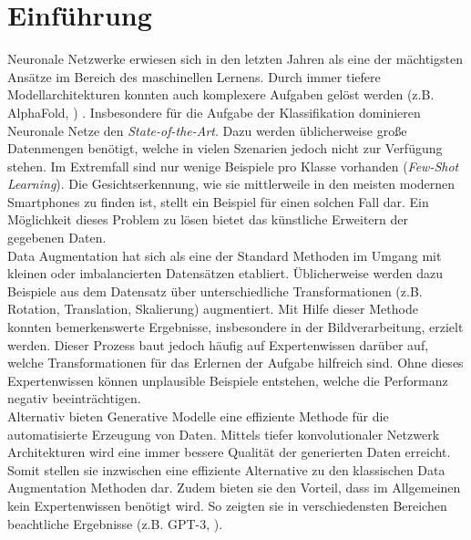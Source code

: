 \chapter{Einführung}
Neuronale Netzwerke erwiesen sich in den letzten Jahren als eine der mächtigsten Ansätze im Bereich des maschinellen Lernens. Durch immer tiefere Modellarchitekturen konnten auch komplexere Aufgaben gelöst werden (z.B. AlphaFold, \cite{Senior2020}) . Insbesondere für die Aufgabe der Klassifikation dominieren Neuronale Netze den \textit{State-of-the-Art}. Dazu werden üblicherweise große Datenmengen benötigt, welche in vielen Szenarien jedoch nicht zur Verfügung stehen. Im Extremfall sind nur wenige Beispiele pro Klasse vorhanden (\textit{Few-Shot Learning}). Die Gesichtserkennung, wie sie mittlerweile in den meisten modernen Smartphones zu finden ist, stellt ein Beispiel für einen solchen Fall dar. Ein Möglichkeit dieses Problem zu lösen bietet das künstliche Erweitern der gegebenen Daten. \\

Data Augmentation hat sich als eine der Standard Methoden im Umgang mit kleinen oder imbalancierten Datensätzen etabliert. Üblicherweise werden dazu Beispiele aus dem Datensatz über unterschiedliche Transformationen (z.B. Rotation, Translation, Skalierung) augmentiert. Mit Hilfe dieser Methode konnten bemerkenswerte Ergebnisse, insbesondere in der Bildverarbeitung, erzielt werden. Dieser Prozess baut jedoch häufig auf Expertenwissen darüber auf, welche Transformationen für das Erlernen der Aufgabe hilfreich sind. Ohne dieses Expertenwissen können unplausible Beispiele entstehen, welche die Performanz negativ beeinträchtigen. \\

Alternativ bieten Generative Modelle eine effiziente Methode für die automatisierte Erzeugung von Daten. Mittels tiefer konvolutionaler Netzwerk Architekturen wird eine immer bessere Qualität der generierten Daten erreicht. Somit stellen sie inzwischen eine effiziente Alternative zu den klassischen Data Augmentation Methoden dar. Zudem bieten sie den Vorteil, dass im Allgemeinen kein Expertenwissen benötigt wird. So zeigten sie in verschiedensten Bereichen beachtliche Ergebnisse (z.B. GPT-3, \cite{brown2020language}). \\

